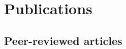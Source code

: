 \documentclass[a4paper, 12pt]{article}
\begin{document}


\section*{Publications}

\subsection*{Peer-reviewed articles}
\end{document}
